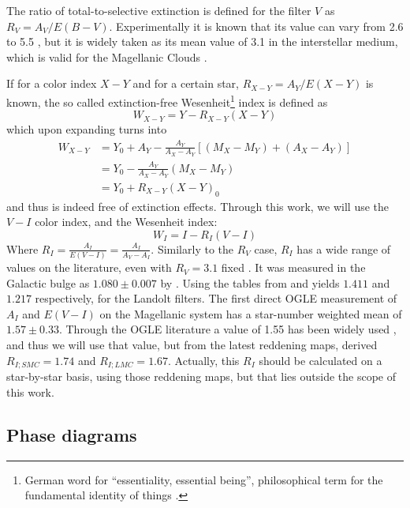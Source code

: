 	The ratio of total-to-selective extinction is defined for the filter $V$ as $R_V = A_V/E(B-V)$. 
	Experimentally it is known that its value can vary from 2.6 to 5.5 \citep{Clayton1988},
	but it is widely taken as its mean value of 3.1 in the interstellar medium, which is valid for the Magellanic Clouds \citep{Cardelli1989,Gorski2020}.
	
	If for a color index $X-Y$ and for a certain star, $R_{X-Y} = A_Y/E(X-Y)$ is known, 
	the so called extinction-free Wesenheit\footnote{
		German word for \enquote{essentiality, essential being}, 
		philosophical term for the fundamental identity of things \citep[page 341]{German1997}.
	}
	index \citep{Madore1982} is defined as
	\begin{equation}
		W_{X-Y} = Y - R_{X-Y} (X-Y) \label{eq:wesenheit}
	\end{equation}
	which upon expanding turns into
	\begin{align*}
		W_{X-Y} &= Y_0 + A_Y - \frac{A_Y}{A_X - A_Y}[ (M_X-M_Y) + (A_X - A_Y) ] \\ 
		&= Y_0 - \frac{A_Y}{A_X - A_Y} (M_X-M_Y)  \\ 
		&= Y_0 + R_{X-Y}(X-Y)_0 
	\end{align*}
	and thus is indeed free of extinction effects. Through this work, we will use the $V-I$ color index, and the Wesenheit index:
	\begin{equation}
	W_I = I - R_I (V-I) \label{eq:wesenheit-i}
	\end{equation}
	Where $R_I = \frac{A_I}{E(V-I)} = \frac{A_I}{A_V - A_I}$. 
	Similarly to the $R_V$ case, $R_I$ has a wide range of values on the literature, even with $R_V=3.1$ fixed \citep[for a discussion see][]{Nataf2015}. 
	It was measured in the Galactic bulge as $1.080\pm0.007$ by \cite{Pietrukowicz2012}. 
	Using the tables from \cite{Schlegel1998} and \cite{Schlafly2011} yields $1.411$ and $1.217$ respectively, for the Landolt filters.
	The first direct OGLE measurement of $A_I$ and $E(V-I)$ on the Magellanic system has a star-number weighted mean of $1.57\pm0.33$.
	Through the OGLE literature a value of 1.55 has been widely used \citep[see for instance][]{OGLE2015,Udalski1999,Ulaczyk2013},
	and thus we will use that value,
	but from the latest reddening maps, \cite{Reddening2021} derived $R_{I;SMC}=1.74$ and $R_{I;LMC}=1.67$.
	Actually, this $R_I$ should be calculated on a star-by-star basis, using those reddening maps,
	but that lies outside the scope of this work.
	
\subsection{Phase diagrams}

